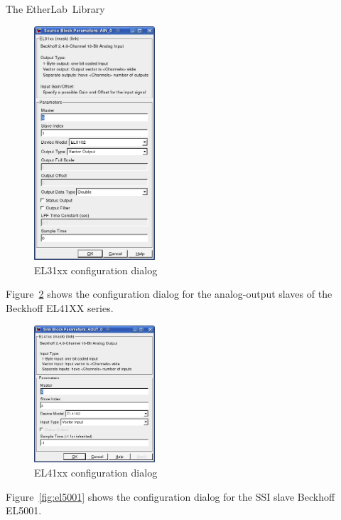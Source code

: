 \begin{ighsec}{The EtherLab\regTM\ Library}
\begin{figure}[H]
  \begin{center}
    \includegraphics[width=0.4\textwidth]{images/el31xx.png}
    \caption{EL31xx configuration dialog}
    \label{fig:el31xx}
  \end{center}
\end{figure}

Figure~\ref{fig:el41xx} shows the configuration dialog for the
analog-output slaves of the Beckhoff EL41XX series.

\begin{figure}[H]
  \begin{center}
    \includegraphics[width=0.4\textwidth]{images/el41xx.png}
    \caption{EL41xx configuration dialog}
    \label{fig:el41xx}
  \end{center}
\end{figure}

Figure~\ref{fig:el5001} shows the configuration dialog for the SSI
slave Beckhoff EL5001.


\end{ighsec}
